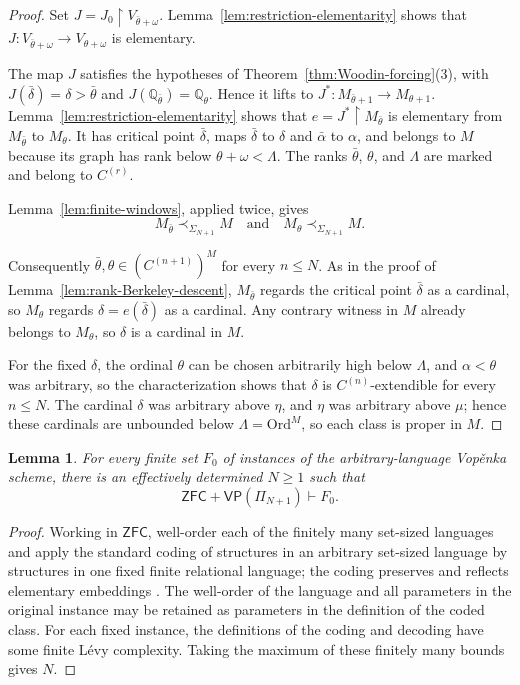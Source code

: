 \documentclass[11pt,a4paper]{amsart}
\newcommand{\VP}{\mathsf{VP}}
\newcommand{\ZFC}{\mathsf{ZFC}}
\newcommand{\Ord}{\mathrm{Ord}}
\newcommand{\restr}{\mathbin{\upharpoonright}}
\theoremstyle{plain}
\newtheorem{lemma}[theorem]{Lemma}
\theoremstyle{definition}
\theoremstyle{remark}
\begin{document}
\begin{proof}
Set $J=J_0\restr V_{\bar\theta+\omega}$.  Lemma~\ref{lem:restriction-elementarity} shows that $J:V_{\bar\theta+\omega}\longrightarrow V_{\theta+\omega}$ is elementary.

The map $J$ satisfies the hypotheses of Theorem~\ref{thm:Woodin-forcing}(3), with $J(\bar\delta)=\delta>\bar\theta$ and $J(\mathbb Q_{\bar\theta})=\mathbb Q_\theta$.  Hence it lifts to $J^*:M_{\bar\theta+1}\longrightarrow M_{\theta+1}$.
Lemma~\ref{lem:restriction-elementarity} shows that $e=J^*\restr M_{\bar\theta}$ is elementary from $M_{\bar\theta}$ to $M_\theta$.  It has critical point $\bar\delta$, maps $\bar\delta$ to $\delta$ and $\bar\alpha$ to $\alpha$, and belongs to $M$ because its graph has rank below $\theta+\omega<\Lambda$.  The ranks $\bar\theta$, $\theta$, and $\Lambda$ are marked and belong to $C^{(r)}$.

Lemma~\ref{lem:finite-windows}, applied twice, gives
\[
M_{\bar\theta}\prec_{\Sigma_{N+1}}M
\quad\text{and}\quad
M_\theta\prec_{\Sigma_{N+1}}M.
\]

Consequently $\bar\theta,\theta\in(C^{(n+1)})^M$ for every $n\leq N$.  As in the proof of Lemma~\ref{lem:rank-Berkeley-descent}, $M_{\bar\theta}$ regards the critical point $\bar\delta$ as a cardinal, so $M_\theta$ regards $\delta=e(\bar\delta)$ as a cardinal.  Any contrary witness in $M$ already belongs to $M_\theta$, so $\delta$ is a cardinal in $M$.

For the fixed $\delta$, the ordinal $\theta$ can be chosen arbitrarily high below $\Lambda$, and $\alpha<\theta$ was arbitrary, so the characterization shows that $\delta$ is $C^{(n)}$-extendible for every $n\leq N$.  The cardinal $\delta$ was arbitrary above $\eta$, and $\eta$ was arbitrary above $\mu$; hence these cardinals are unbounded below $\Lambda=\Ord^M$, so each class is proper in $M$.
\end{proof}

\begingroup

\begin{lemma}\label{lem:finite-language-reduction}
For every finite set $F_0$ of instances of the arbitrary-language Vop\v{e}nka scheme, there is an effectively determined $N\geq1$ such that
\[
\ZFC+\VP(\Pi_{N+1})\vdash F_0.
\]
\end{lemma}

\begin{proof}
Working in $\ZFC$, well-order each of the finitely many set-sized languages and apply the standard coding of structures in an arbitrary set-sized language by structures in one fixed finite relational language; the coding preserves and reflects elementary embeddings \cite[pp.~2--3]{BrookeTaylor}.  The well-order of the language and all parameters in the original instance may be retained as parameters in the definition of the coded class.  For each fixed instance, the definitions of the coding and decoding have some finite L\'evy complexity.  Taking the maximum of these finitely many bounds gives $N$.
\end{proof}
\endgroup
\end{document}
